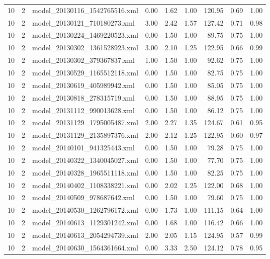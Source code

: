 \begin{table}[ht]
\begin{tabular}{rrlrrrrrr}
   10 &   2 & model\_20130116\_1542765516.xml & 0.00 & 1.62 & 1.00 & 120.95 & 0.69 & 1.00 \\ 
   10 &   2 & model\_20130121\_710180273.xml & 3.00 & 2.42 & 1.57 & 127.42 & 0.71 & 0.98 \\ 
   10 &   2 & model\_20130224\_1469220523.xml & 0.00 & 1.50 & 1.00 & 89.75 & 0.75 & 1.00 \\ 
   10 &   2 & model\_20130302\_1361528923.xml & 3.00 & 2.10 & 1.25 & 122.95 & 0.66 & 0.99 \\ 
   10 &   2 & model\_20130302\_379367837.xml & 1.00 & 1.50 & 1.00 & 92.62 & 0.75 & 1.00 \\ 
   10 &   2 & model\_20130529\_1165512118.xml & 0.00 & 1.50 & 1.00 & 82.75 & 0.75 & 1.00 \\ 
   10 &   2 & model\_20130619\_405989942.xml & 0.00 & 1.50 & 1.00 & 85.05 & 0.75 & 1.00 \\ 
   10 &   2 & model\_20130818\_278315719.xml & 0.00 & 1.50 & 1.00 & 88.95 & 0.75 & 1.00 \\ 
   10 &   2 & model\_20131112\_990013628.xml & 0.00 & 1.50 & 1.00 & 86.12 & 0.75 & 1.00 \\ 
   10 &   2 & model\_20131129\_1795005487.xml & 2.00 & 2.27 & 1.35 & 124.67 & 0.61 & 0.95 \\ 
   10 &   2 & model\_20131129\_2135897376.xml & 2.00 & 2.12 & 1.25 & 122.95 & 0.60 & 0.97 \\ 
   10 &   2 & model\_20140101\_941325443.xml & 0.00 & 1.50 & 1.00 & 79.28 & 0.75 & 1.00 \\ 
   10 &   2 & model\_20140322\_1340045027.xml & 0.00 & 1.50 & 1.00 & 77.70 & 0.75 & 1.00 \\ 
   10 &   2 & model\_20140328\_1965511118.xml & 0.00 & 1.50 & 1.00 & 82.25 & 0.75 & 1.00 \\ 
   10 &   2 & model\_20140402\_1108338221.xml & 0.00 & 2.02 & 1.25 & 122.00 & 0.68 & 1.00 \\ 
   10 &   2 & model\_20140509\_978687642.xml & 0.00 & 1.50 & 1.00 & 79.60 & 0.75 & 1.00 \\ 
   10 &   2 & model\_20140530\_1262796172.xml & 0.00 & 1.73 & 1.00 & 111.15 & 0.64 & 1.00 \\ 
   10 &   2 & model\_20140613\_1129301242.xml & 0.00 & 1.68 & 1.00 & 116.42 & 0.66 & 1.00 \\ 
   10 &   2 & model\_20140613\_2054294739.xml & 2.00 & 2.05 & 1.15 & 124.95 & 0.57 & 0.99 \\ 
   10 &   2 & model\_20140630\_1564361664.xml & 0.00 & 3.33 & 2.50 & 124.12 & 0.78 & 0.95 \\ 

\end{tabular}
\end{table}
